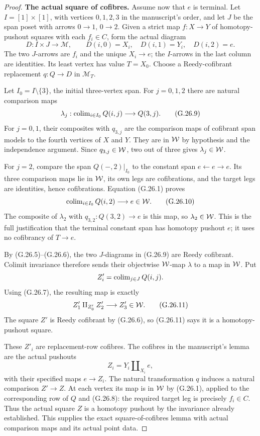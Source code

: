 \begin{proof}
\par\smallskip\noindent\textbf{The actual square of cofibres.}\quad
Assume now that $e$ is terminal. Let $I=[1]\times[1]$, with vertices $0,1,2,3$ in the manuscript's order, and let $J$ be the span poset with arrows $0\to1$, $0\to2$. Given a strict map $f:X\to Y$ of homotopy-pushout squares with each $f_i\in C$, form the actual diagram
\[
D:I\times J\longrightarrow\mathcal M,\qquad
D(i,0)=X_i,\quad D(i,1)=Y_i,\quad D(i,2)=e.                   \tag{G.26.8}
\]
The two $J$-arrows are $f_i$ and the unique $X_i\to e$; the $I$-arrows in the last column are identities. Its least vertex has value $T=X_0$. Choose a Reedy-cofibrant replacement $q:Q\to D$ in $\mathcal M_T$.

Let $I_0=I\setminus\{3\}$, the initial three-vertex span. For $j=0,1,2$ there are natural comparison maps
\[
\lambda_j:\operatorname{colim}_{i\in I_0}Q(i,j)\longrightarrow Q(3,j).
                                                               \tag{G.26.9}
\]
For $j=0,1$, their composites with $q_{3,j}$ are the comparison maps of cofibrant span models to the fourth vertices of $X$ and $Y$. They are in $\mathcal{W}$ by hypothesis and the independence argument. Since $q_{3,j}\in\mathcal{W}$, two out of three gives $\lambda_j\in\mathcal{W}$.

For $j=2$, compare the span $Q(-,2)|_{I_0}$ to the constant span $e\leftarrow e\to e$. Its three comparison maps lie in $\mathcal{W}$, its own legs are cofibrations, and the target legs are identities, hence cofibrations. Equation (G.26.1) proves
\[
\operatorname{colim}_{i\in I_0}Q(i,2)\longrightarrow e\in\mathcal{W}.
                                                               \tag{G.26.10}
\]
The composite of $\lambda_2$ with $q_{3,2}:Q(3,2)\to e$ is this map, so $\lambda_2\in\mathcal{W}$. This is the full justification that the terminal constant span has homotopy pushout $e$; it uses no cofibrancy of $T\to e$.

By (G.26.5)--(G.26.6), the two $J$-diagrams in (G.26.9) are Reedy cofibrant. Colimit invariance therefore sends their objectwise $\mathcal{W}$-map $\lambda$ to a map in $\mathcal{W}$. Put
\[
Z'_i=\operatorname{colim}_{j\in J}Q(i,j).
\]
Using (G.26.7), the resulting map is exactly
\[
Z'_1\amalg_{Z'_0}Z'_2\longrightarrow Z'_3\in\mathcal{W}.               \tag{G.26.11}
\]
The square $Z'$ is Reedy cofibrant by (G.26.6), so (G.26.11) says it is a homotopy-pushout square.

These $Z'_i$ are replacement-row cofibres. The cofibres in the manuscript's lemma are the actual pushouts
\[
Z_i=Y_i\amalg_{X_i}e,
\]
with their specified maps $e\to Z_i$. The natural transformation $q$ induces a natural comparison $Z'\to Z$. At each vertex its map is in $\mathcal{W}$ by (G.26.1), applied to the corresponding row of $Q$ and (G.26.8): the required target leg is precisely $f_i\in C$. Thus the actual square $Z$ is a homotopy pushout by the invariance already established. This supplies the exact square-of-cofibres lemma with actual comparison maps and its actual point data.


\end{proof}
